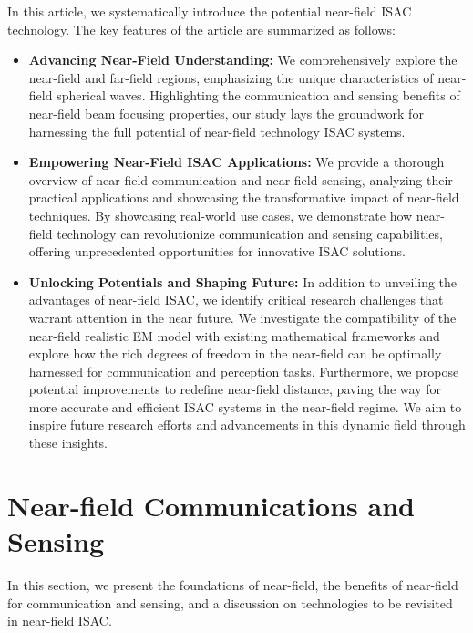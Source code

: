 \documentclass[10pt,journal,twocolumn,twoside]{IEEEtran} %
\begin{document}
In this article, we systematically introduce the potential near-field ISAC technology. 
The key features of the article are summarized as follows:
\begin{itemize}
   \item \textbf{Advancing Near-Field Understanding:} We comprehensively explore the near-field and far-field regions, emphasizing the unique characteristics of near-field spherical waves. Highlighting the communication and sensing benefits of near-field beam focusing properties, our study lays the groundwork for harnessing the full potential of near-field technology ISAC systems.
    \item
    \textbf{Empowering Near-Field ISAC Applications:} We provide a thorough overview of near-field communication and near-field sensing, analyzing their practical applications and showcasing the transformative impact of near-field techniques. By showcasing real-world use cases, we demonstrate how near-field technology can revolutionize communication and sensing capabilities, offering unprecedented opportunities for innovative ISAC solutions.
    \item 
    \textbf{Unlocking Potentials and Shaping Future:} In addition to unveiling the advantages of near-field ISAC, we identify critical research challenges that warrant attention in the near future. We investigate the compatibility of the near-field realistic EM model with existing mathematical frameworks and explore how the rich degrees of freedom in the near-field can be optimally harnessed for communication and perception tasks. Furthermore, we propose potential improvements to redefine near-field distance, paving the way for more accurate and efficient ISAC systems in the near-field regime. We aim to inspire future research efforts and advancements in this dynamic field through these insights.
\end{itemize}
\section{Near-field Communications and Sensing}
In this section, we present the foundations of near-field, the benefits of near-field for communication and sensing, and a discussion on technologies to be revisited in near-field ISAC.
\end{document}
